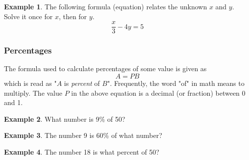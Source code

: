 \documentclass[addpoints,12pt]{exam}
\theoremstyle{definition}
\theoremstyle{break}
\theoremstyle{break}
\newtheorem{example}{Example}[subsection]
\begin{document}
\newpage

\begin{example}
The following formula (equation) relates the unknown $x$ and $y$. Solve it once for $x$, then for $y$.
\[\dfrac{x}{3} - 4y = 5\]
\vspace{2in}
\end{example}

\subsubsection*{Percentages}
\noindent The formula used to calculate percentages of some value is given as
\[A = PB\]
which is read as "$A$ is \emph{percent} of $B$". Frequently, the word "of" in math means to multiply. The value $P$ in the above equation is a decimal (or fraction) between 0 and 1.

\vspace{.15in}

\begin{example}
What number is 9\% of 50?
\vspace{.75in}
\end{example}

\begin{example}
The number 9 is 60\% of what number?
\vspace{.75in}
\end{example}
\begin{example}
The number 18 is what percent of 50?
\end{example}
\end{document}
